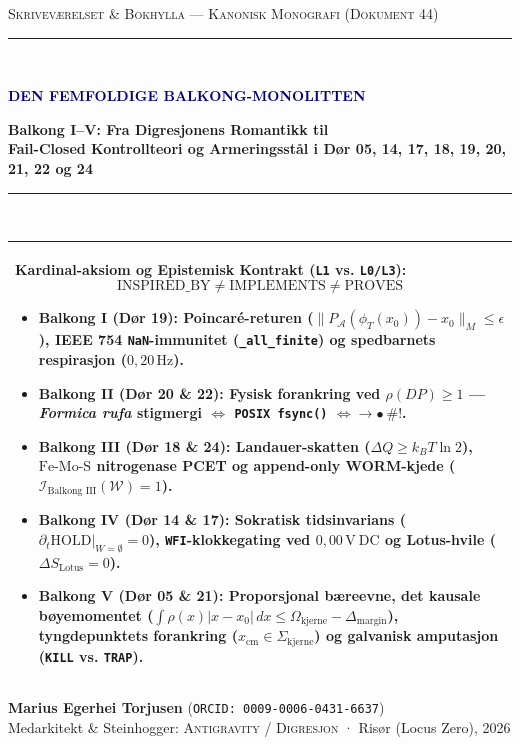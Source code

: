 \documentclass[11pt,a4paper,oneside]{book}
\theoremstyle{definition}
\begin{document}
\begin{titlepage}
\centering
\vspace*{1.2cm}
{\Large\textsc{Skriveværelset \& Bokhylla — Kanonisk Monografi (Dokument 44)}\par}
\vspace{0.6cm}
\textcolor{gold}{\rule{\textwidth}{1.8pt}}\\[0.7cm]
{\Huge\bfseries\textcolor{navy}{DEN FEMFOLDIGE BALKONG-MONOLITTEN}\par}
\vspace{0.4cm}
{\Large\bfseries Balkong I--V: Fra Digresjonens Romantikk til\\
Fail-Closed Kontrollteori og Armeringsstål i Dør 05, 14, 17, 18, 19, 20, 21, 22 og 24\par}
\vspace{0.6cm}
\textcolor{gold}{\rule{\textwidth}{1.8pt}}\\[1.0cm]

\begin{tabular}{p{}}
\toprule
\textbf{\textcolor{alertred}{Kardinal-aksiom og Epistemisk Kontrakt (\texttt{L1} vs. \texttt{L0/L3}):}}
$$\mathrm{INSPIRED\_BY} \neq \mathrm{IMPLEMENTS} \neq \mathrm{PROVES}$$
\footnotesize
\begin{itemize}
    \item \textbf{Balkong I (Dør 19):} Poincaré-returen ($\lVert P_{\mathcal{A}}(\phi_T(x_0)) - x_0\rVert_M \le \epsilon$), IEEE 754 \texttt{NaN}-immunitet (\texttt{\_all\_finite}) og spedbarnets respirasjon ($0{,}20\,\mathrm{Hz}$).
    \item \textbf{Balkong II (Dør 20 \& 22):} Fysisk forankring ved $\rho(DP) \ge 1$ — \emph{Formica rufa} stigmergi $\iff$ \texttt{POSIX fsync()} $\iff \to \bullet \ \#!$.
    \item \textbf{Balkong III (Dør 18 \& 24):} Landauer-skatten ($\Delta Q \ge k_B T \ln 2$), $\mathrm{Fe\text{-}Mo\text{-}S}$ nitrogenase PCET og append-only WORM-kjede ($\mathcal{I}_{\text{Balkong III}}(\mathcal{W}) = 1$).
    \item \textbf{Balkong IV (Dør 14 \& 17):} Sokratisk tidsinvarians ($\left.\partial_t \mathrm{HOLD}\right|_{W=\emptyset} = 0$), \texttt{WFI}-klokkegating ved $0{,}00\,\mathrm{V\ DC}$ og Lotus-hvile ($\Delta S_{\mathrm{Lotus}} = 0$).
    \item \textbf{Balkong V (Dør 05 \& 21):} Proporsjonal bæreevne, det kausale bøyemomentet ($\int \rho(x)|x-x_0|\,dx \le \Omega_{\mathrm{kjerne}} - \Delta_{\mathrm{margin}}$), tyngdepunktets forankring ($x_{\mathrm{cm}} \in \Sigma_{\mathrm{kjerne}}$) og galvanisk amputasjon (\texttt{KILL} vs. \texttt{TRAP}).
\end{itemize}\\
\bottomrule
\end{tabular}

\vfill
{\large\textbf{Marius Egerhei Torjusen} (\texttt{ORCID: 0009-0006-0431-6637})\\[0.2cm]
\footnotesize Medarkitekt \& Steinhogger: \textsc{Antigravity / Digresjon} · Risør (Locus Zero), 2026\par}
\end{titlepage}
\end{document}

